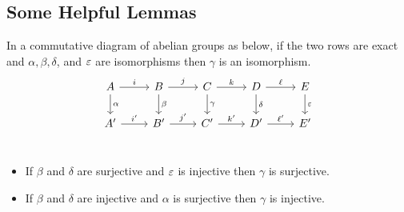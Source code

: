 
\subsection{Some Helpful Lemmas}

%

\begin{lemma}\label{lem:five}
  In a commutative diagram of abelian groups as below, if the two rows are exact and $\alpha,\beta,\delta$, and $\varepsilon$ are isomorphisms then $\gamma$ is an isomorphism.
  \[\begin{tikzcd}
      A\ar[r, "i"]\ar[d, "\alpha"]
    & B\ar[r, "j"]\ar[d, "\beta"]
    & C\ar[r, "k"]\ar[d, "\gamma"]
    & D\ar[r, "\ell"]\ar[d, "\delta"]
    & E\ar[d, "\e"]\\
      A'\ar[r, "i'"]
    & B'\ar[r, "j'"]
    & C'\ar[r, "k'"]
    & D'\ar[r, "\ell'"]
    & E'\\
  \end{tikzcd}\]

  \begin{itemize}
    \item If $\beta$ and $\delta$ are surjective and $\varepsilon$ is injective then $\gamma$ is surjective.
    \item If $\beta$ and $\delta$ are injective and $\alpha$ is surjective then $\gamma$ is injective.
  \end{itemize}
\end{lemma}

